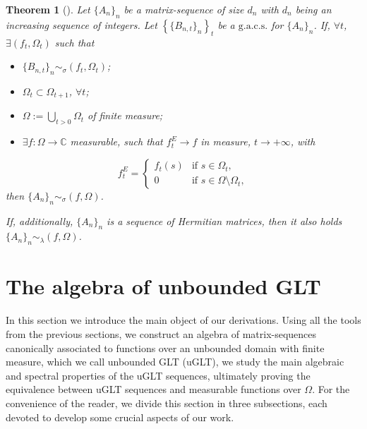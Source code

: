 \documentclass{amsart}
\newtheorem{thm}{Theorem}[section]
\begin{document}
\begin{thm}[\cite{gacs}]\label{gacs_sing_val}
	Let $\{A_n\}_n$ be a matrix-sequence of size $ d_n$ with $ d_n $ being an increasing sequence of integers. Let $\left\{\{B_{n,t}\}_{n}\right\}_{t}$ be a $\mathrm{g.a.c.s.}$ for $\{A_n\}_n$. If, $\forall t$, $\exists\left(f_t,\Omega_t\right)$ such that \\
	\begin{itemize}
		\item $\{B_{n,t}\}_{n} \sim_{\sigma} (f_t,\Omega_t)$;\\
		\item $\Omega_t \subset \Omega_{t+1}$, $\forall t$;\\
		\item $\Omega := \bigcup\limits_{t>0} \Omega_t$ of finite measure;\\
		\item $\exists f: \Omega\to\mathbb{C}
		$ measurable, such that $f^{E}_t\to f$ in measure, $t\to +\infty$, with
	\end{itemize}
	\begin{equation*}
	f_t^E= \begin{cases}
	f_t(s) & \text{if } s \in \Omega_t, \\
	0 & \text{if } s \in \Omega\setminus \Omega_t,
	\end{cases}
	\end{equation*}
	then $\{A_n\}_n \sim_{\sigma} (f,\Omega)$.

    If, additionally, $\{A_n\}_n$ is a sequence of Hermitian matrices, then it also holds $\{A_n\}_n \sim_{\lambda} (f,\Omega)$.
\end{thm}



\section{The algebra of unbounded GLT}\label{sec-UGLT}

In this section we introduce the main object of our derivations. Using all the tools from the previous sections, we construct an algebra of matrix-sequences canonically associated to functions over an unbounded domain with finite measure, which we call unbounded GLT (uGLT), we study the main algebraic and spectral properties of the uGLT sequences, ultimately proving the equivalence between uGLT sequences and measurable functions over $\Omega$. For the convenience of the reader, we divide this section in three subsections, each devoted to develop some crucial aspects of our work.
\end{document}

